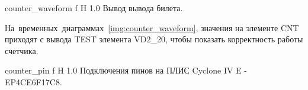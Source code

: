 \documentclass{bmstu}
\begin{document}
	{counter_waveform}
	{f} %
	{H} %
	{1.0\textwidth} %
	{Вывод вывода билета.} %

	\begin{flushleft}
		На~временных~диаграммах~\ref{img:counter_waveform}, значения на элементе 
		CNT приходят с вывода TEST элемента VD2\_20, чтобы показать корректность 
		работы счетчика.
	\end{flushleft}

	{counter_pin}
	{f} %
	{H} %
	{1.0\textwidth} %
	{Подключения пинов на ПЛИС Cyclone IV E - EP4CE6F17C8.} %
	
\end{document}
